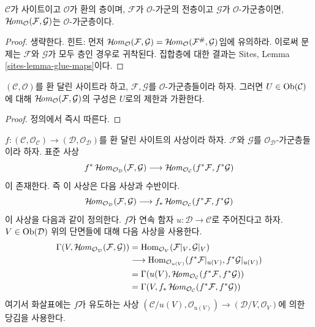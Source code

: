 \begin{lemma}
\label{lemma-internal-hom}
$\mathcal{C}$가 사이트이고 $\mathcal{O}$가 환의 층이며,
$\mathcal{F}$가 $\mathcal{O}$-가군의 전층이고 $\mathcal{G}$가
$\mathcal{O}$-가군층이면,
$\mathop{\mathcal{H}\!\mathit{om}}\nolimits_\mathcal{O}(\mathcal{F}, \mathcal{G})$는
$\mathcal{O}$-가군층이다.
\end{lemma}

\begin{proof}
생략한다. 힌트: 먼저
$\mathop{\mathcal{H}\!\mathit{om}}\nolimits_\mathcal{O}(\mathcal{F}, \mathcal{G})
= \mathop{\mathcal{H}\!\mathit{om}}\nolimits_\mathcal{O}(\mathcal{F}^\#, \mathcal{G})$임에 유의하라. 이로써
문제는 $\mathcal{F}$와 $\mathcal{G}$가 모두 층인 경우로 귀착된다.
집합층에 대한 결과는 Sites, Lemma \ref{sites-lemma-glue-maps}이다.
\end{proof}

\begin{lemma}
\label{lemma-internal-hom-restriction}
$(\mathcal{C}, \mathcal{O})$를 환 달린 사이트라 하고,
$\mathcal{F}, \mathcal{G}$를 $\mathcal{O}$-가군층들이라 하자.
그러면 $U \in \mathop{\mathrm{Ob}}\nolimits(\mathcal{C})$에 대해
$\mathop{\mathcal{H}\!\mathit{om}}\nolimits_\mathcal{O}(\mathcal{F}, \mathcal{G})$의 구성은 $U$로의 제한과
가환한다.
\end{lemma}

\begin{proof}
정의에서 즉시 따른다.
\end{proof}

\begin{remark}
\label{remark-pullback-internal-hom}
$f : (\mathcal{C}, \mathcal{O}_\mathcal{C}) \to
(\mathcal{D}, \mathcal{O}_\mathcal{D})$를 환 달린 사이트의 사상이라 하자.
$\mathcal{F}$와 $\mathcal{G}$를 $\mathcal{O}_\mathcal{D}$-가군층들이라 하자.
표준 사상
$$
f^*\mathop{\mathcal{H}\!\mathit{om}}\nolimits_{\mathcal{O}_\mathcal{D}}(\mathcal{F}, \mathcal{G})
\longrightarrow
\mathop{\mathcal{H}\!\mathit{om}}\nolimits_{\mathcal{O}_\mathcal{C}}(f^*\mathcal{F}, f^*\mathcal{G})
$$
이 존재한다. 즉 이 사상은 다음 사상과 수반이다.
$$
\mathop{\mathcal{H}\!\mathit{om}}\nolimits_{\mathcal{O}_\mathcal{D}}(\mathcal{F}, \mathcal{G})
\longrightarrow
f_*\mathop{\mathcal{H}\!\mathit{om}}\nolimits_{\mathcal{O}_\mathcal{C}}(f^*\mathcal{F}, f^*\mathcal{G})
$$
이 사상을 다음과 같이 정의한다. $f$가 연속 함자
$u : \mathcal{D} \to \mathcal{C}$로 주어진다고 하자.
$V \in \mathop{\mathrm{Ob}}\nolimits(\mathcal{D})$ 위의 단면들에 대해 다음 사상을 사용한다.
\begin{align*}
\Gamma(V, \mathop{\mathcal{H}\!\mathit{om}}\nolimits_{\mathcal{O}_\mathcal{D}}(\mathcal{F}, \mathcal{G}))
& =
\mathop{\mathrm{Hom}}\nolimits_{\mathcal{O}_V}(\mathcal{F}|_V, \mathcal{G}|_V) \\
& \longrightarrow
\mathop{\mathrm{Hom}}\nolimits_{\mathcal{O}_{u(V)}}(f^*\mathcal{F}|_{u(V)}, f^*\mathcal{G}|_{u(V)}) \\
& =
\Gamma(u(V), \mathop{\mathcal{H}\!\mathit{om}}\nolimits_{\mathcal{O}_\mathcal{C}}(f^*\mathcal{F},
f^*\mathcal{G})) \\
& =
\Gamma(V, f_*\mathop{\mathcal{H}\!\mathit{om}}\nolimits_{\mathcal{O}_\mathcal{C}}(f^*\mathcal{F},
f^*\mathcal{G}))
\end{align*}
여기서 화살표에는 $f$가 유도하는 사상
$(\mathcal{C}/u(V), \mathcal{O}_{u(V)}) \to
(\mathcal{D}/V, \mathcal{O}_V)$에 의한 당김을 사용한다.
\end{remark}

